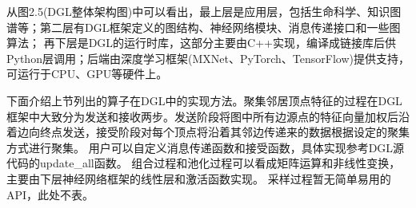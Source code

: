 从图2.5(DGL整体架构图)中可以看出，最上层是应用层，包括生命科学、知识图谱等；第二层有DGL框架定义的图结构、神经网络模块、消息传递接口和一些图算法；
再下层是DGL的运行时库，这部分主要由C++实现，编译成链接库后供Python层调用；后端由深度学习框架(MXNet、PyTorch、TensorFlow)提供支持，可运行于CPU、GPU等硬件上。

下面介绍上节列出的算子在DGL中的实现方法。聚集邻居顶点特征的过程在DGL框架中大致分为发送和接收两步。发送阶段将图中所有边源点的特征向量加权后沿着边向终点发送，接受阶段对每个顶点将沿着其邻边传递来的数据根据设定的聚集方式进行聚集。
用户可以自定义消息传递函数和接受函数，具体实现参考DGL源代码的update\_all函数。
组合过程和池化过程可以看成矩阵运算和非线性变换，主要由下层神经网络框架的线性层和激活函数实现。
采样过程暂无简单易用的API，此处不表。
